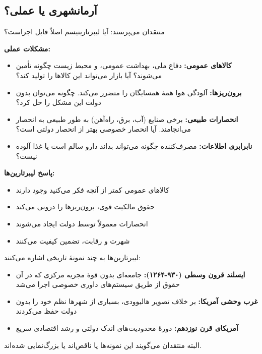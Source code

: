 \subsection{آرمانشهری یا عملی؟}


منتقدان می‌پرسند: آیا لیبرتارینیسم اصلاً قابل اجراست؟

\textbf{مشکلات عملی:}
\begin{itemize}
    \item \textbf{کالاهای عمومی:} دفاع ملی، بهداشت عمومی، و محیط زیست چگونه تأمین می‌شوند؟ آیا بازار می‌تواند این کالاها را تولید کند؟
    \item \textbf{برون‌ریزها:} آلودگی هوا همهٔ همسایگان را متضرر می‌کند. چگونه می‌توان بدون دولت این مشکل را حل کرد؟
    \item \textbf{انحصارات طبیعی:} برخی صنایع (آب، برق، راه‌آهن) به طور طبیعی به انحصار می‌انجامند. آیا انحصار خصوصی بهتر از انحصار دولتی است؟
    \item \textbf{نابرابری اطلاعات:} مصرف‌کننده چگونه می‌تواند بداند دارو سالم است یا غذا آلوده نیست؟
\end{itemize}

\textbf{پاسخ لیبرتارین‌ها:}
\begin{itemize}
    \item کالاهای عمومی کمتر از آنچه فکر می‌کنید وجود دارند
    \item حقوق مالکیت قوی، برون‌ریزها را درونی می‌کند
    \item انحصارات معمولاً توسط دولت ایجاد می‌شوند
    \item شهرت و رقابت، تضمین کیفیت می‌کنند
\end{itemize}

\begin{tcolorbox}[
    enhanced,
    colback=goldaccent!10,
    colframe=goldaccent,
    boxrule=1.5pt,
    arc=5pt,
    fonttitle=\bfseries,
    title={\rl{🟡 نکته تاریخی: آیا نمونهٔ تاریخی وجود دارد؟}}
]
لیبرتارین‌ها به چند نمونهٔ تاریخی اشاره می‌کنند:

\begin{itemize}
    \item \textbf{ایسلند قرون وسطی (۹۳۰-۱۲۶۴):} جامعه‌ای بدون قوهٔ مجریه مرکزی که در آن حقوق از طریق سیستم‌های داوری خصوصی اجرا می‌شد
    \item \textbf{غرب وحشی آمریکا:} بر خلاف تصویر هالیوودی، بسیاری از شهرها نظم خود را بدون دولت حفظ می‌کردند
    \item \textbf{آمریکای قرن نوزدهم:} دورهٔ محدودیت‌های اندک دولتی و رشد اقتصادی سریع
\end{itemize}

البته منتقدان می‌گویند این نمونه‌ها یا ناقص‌اند یا بزرگ‌نمایی شده‌اند.
\end{tcolorbox}

